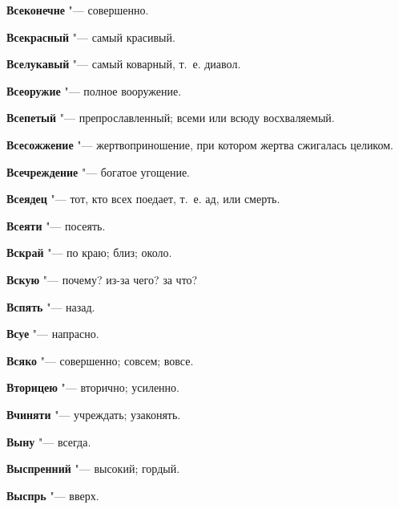 \begin{mymulticols}{2}
\noindent\textbf{Всеконечне} "--- совершенно. 




\noindent\textbf{Всекрасный} "--- самый красивый. 




\noindent\textbf{Вселукавый} "--- самый коварный, т.~е. диавол. 




\noindent\textbf{Всеоружие} "--- полное вооружение. 




\noindent\textbf{Всепетый} "--- препрославленный; всеми или всюду восхваляемый. 




\noindent\textbf{Всесожжение} "--- жертвоприношение, при котором жертва сжигалась целиком. 




\noindent\textbf{Всечреждение} "--- богатое угощение. 




\noindent\textbf{Всеядец} "--- тот, кто всех поедает, т.~е. ад, или смерть. 




\noindent\textbf{Всеяти} "--- посеять. 




\noindent\textbf{Вскрай} "--- по краю; близ; около. 




\noindent\textbf{Вскую} "--- почему? из-за чего? за что? 




\noindent\textbf{Вспять} "--- назад. 




\noindent\textbf{Всуе} "--- напрасно. 




\noindent\textbf{Всяко} "--- совершенно; совсем; вовсе. 




\noindent\textbf{Вторицею} "--- вторично; усиленно. 




\noindent\textbf{Вчиняти} "--- учреждать; узаконять. 




\noindent\textbf{Выну} "--- всегда. 




\noindent\textbf{Выспренний} "--- высокий; гордый. 




\noindent\textbf{Выспрь} "--- вверх. 





\end{mymulticols}
